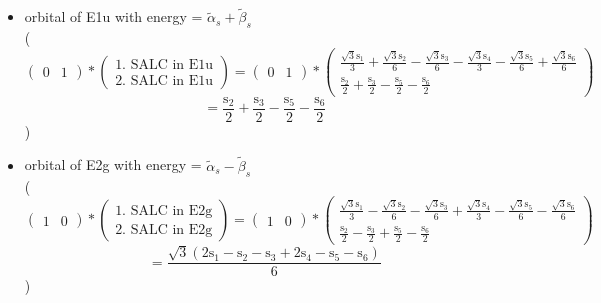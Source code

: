 \documentclass[12pt,a4paper]{article}
\begin{document}
\begin{itemize}
\item orbital of E1u with energy = 
                                $\tilde{\alpha}_{s} + \tilde{\beta}_{s}$ \\
( 
$$
\begin{pmatrix}0 & 1\end{pmatrix} * \left(\begin{array}{c}\text{1. SALC in E1u} \\ \text{2. SALC in E1u}\end{array}\right) = \begin{pmatrix}0 & 1\end{pmatrix} * \begin{pmatrix}\frac{\sqrt{3} \text{s}_{1}}{3} + \frac{\sqrt{3} \text{s}_{2}}{6} - \frac{\sqrt{3} \text{s}_{3}}{6} - \frac{\sqrt{3} \text{s}_{4}}{3} - \frac{\sqrt{3} \text{s}_{5}}{6} + \frac{\sqrt{3} \text{s}_{6}}{6}\\\frac{\text{s}_{2}}{2} + \frac{\text{s}_{3}}{2} - \frac{\text{s}_{5}}{2} - \frac{\text{s}_{6}}{2}\end{pmatrix} 
 $$ $$ = \frac{\text{s}_{2}}{2} + \frac{\text{s}_{3}}{2} - \frac{\text{s}_{5}}{2} - \frac{\text{s}_{6}}{2} 
 $$ 
 )

\item orbital of E2g with energy = 
                                $\tilde{\alpha}_{s} - \tilde{\beta}_{s}$ \\
( 
$$
\begin{pmatrix}1 & 0\end{pmatrix} * \left(\begin{array}{c}\text{1. SALC in E2g} \\ \text{2. SALC in E2g}\end{array}\right) = \begin{pmatrix}1 & 0\end{pmatrix} * \begin{pmatrix}\frac{\sqrt{3} \text{s}_{1}}{3} - \frac{\sqrt{3} \text{s}_{2}}{6} - \frac{\sqrt{3} \text{s}_{3}}{6} + \frac{\sqrt{3} \text{s}_{4}}{3} - \frac{\sqrt{3} \text{s}_{5}}{6} - \frac{\sqrt{3} \text{s}_{6}}{6}\\\frac{\text{s}_{2}}{2} - \frac{\text{s}_{3}}{2} + \frac{\text{s}_{5}}{2} - \frac{\text{s}_{6}}{2}\end{pmatrix} 
 $$ $$ = \frac{\sqrt{3} \left(2 \text{s}_{1} - \text{s}_{2} - \text{s}_{3} + 2 \text{s}_{4} - \text{s}_{5} - \text{s}_{6}\right)}{6} 
 $$ 
 )


\end{itemize}
\end{document}
